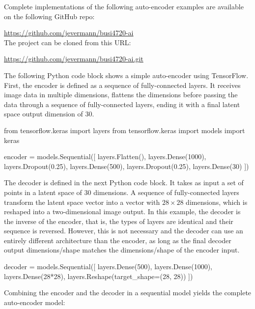 \begin{withcode}
\begin{resourcebox}
Complete implementations of the following auto-encoder examples are available on the following GitHub repo:

\url{https://github.com/jevermann/busi4720-ai} \\

The project can be cloned from this URL:

\url{https://github.com/jevermann/busi4720-ai.git}
\end{resourcebox}

The following Python code block shows a simple auto-encoder using TensorFlow. First, the encoder is defined as a sequence of fully-connected layers. It receives image data in multiple dimensions, flattens the dimensions before passing the data through a sequence of fully-connected layers, ending it with a final latent space output dimension of $30$. 

\begin{pythoncode}
from tensorflow.keras import layers
from tensorflow.keras import models
import keras

encoder = models.Sequential([
    layers.Flatten(),
    layers.Dense(1000),
    layers.Dropout(0.25),
    layers.Dense(500),
    layers.Dropout(0.25),
    layers.Dense(30)
])
\end{pythoncode}

The decoder is defined in the next Python code block. It takes as input a set of points in a latent space of $30$ dimensions. A sequence of fully-connected layers transform the latent space vector into a vector with $28 \times 28$ dimensions, which is reshaped into a two-dimensional image output. In this example, the decoder is the inverse of the encoder, that is, the types of layers are identical and their sequence is reversed. However, this is not necessary and the decoder can use an entirely different architecture than the encoder, as long as the final decoder output dimensions/shape matches the dimensions/shape of the encoder input.

\begin{pythoncode}
decoder = models.Sequential([
    layers.Dense(500),
    layers.Dense(1000),
    layers.Dense(28*28),
    layers.Reshape(target_shape=(28, 28))
])
\end{pythoncode}

Combining the encoder and the decoder in a sequential model yields the complete auto-encoder model:


\end{withcode}

